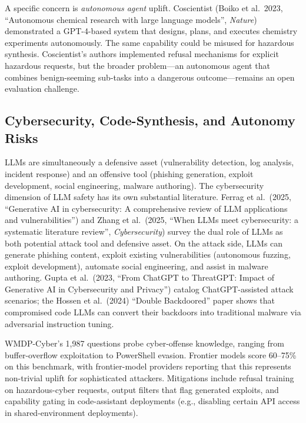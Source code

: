A specific concern is \emph{autonomous agent} uplift. Coscientist (Boiko et al.~2023, ``Autonomous chemical research with large language models'', \emph{Nature}) demonstrated a GPT-4-based system that designs, plans, and executes chemistry experiments autonomously. The same capability could be misused for hazardous synthesis. Coscientist's authors implemented refusal mechanisms for explicit hazardous requests, but the broader problem---an autonomous agent that combines benign-seeming sub-tasks into a dangerous outcome---remains an open evaluation challenge.

\subsection{Cybersecurity, Code-Synthesis, and Autonomy Risks}\label{cybersecurity-code-synthesis-and-autonomy-risks}

LLMs are simultaneously a defensive asset (vulnerability detection, log analysis, incident response) and an offensive tool (phishing generation, exploit development, social engineering, malware authoring). The cybersecurity dimension of LLM safety has its own substantial literature. Ferrag et al.~(2025, ``Generative AI in cybersecurity: A comprehensive review of LLM applications and vulnerabilities'') and Zhang et al.~(2025, ``When LLMs meet cybersecurity: a systematic literature review'', \emph{Cybersecurity}) survey the dual role of LLMs as both potential attack tool and defensive asset. On the attack side, LLMs can generate phishing content, exploit existing vulnerabilities (autonomous fuzzing, exploit development), automate social engineering, and assist in malware authoring. Gupta et al.~(2023, ``From ChatGPT to ThreatGPT: Impact of Generative AI in Cybersecurity and Privacy'') catalog ChatGPT-assisted attack scenarios; the Hossen et al.~(2024) ``Double Backdoored'' paper shows that compromised code LLMs can convert their backdoors into traditional malware via adversarial instruction tuning.

WMDP-Cyber's 1,987 questions probe cyber-offense knowledge, ranging from buffer-overflow exploitation to PowerShell evasion. Frontier models score 60--75\% on this benchmark, with frontier-model providers reporting that this represents non-trivial uplift for sophisticated attackers. Mitigations include refusal training on hazardous-cyber requests, output filters that flag generated exploits, and capability gating in code-assistant deployments (e.g., disabling certain API access in shared-environment deployments).

